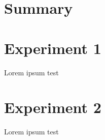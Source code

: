 \documentclass[a4paper]{paper}
\begin{document}

\tableofcontents

\section{Summary}

\section{Experiment 1}
Lorem ipsum test

\section{Experiment 2}
Lorem ipsum test
\end{document}
